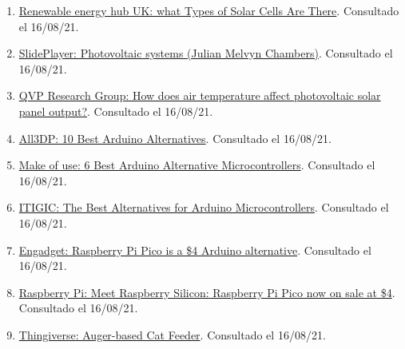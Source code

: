 \documentclass[12pt]{article}
\begin{document}
\begin{enumerate}
			\item 
			\label{bib: renewable energy hub main types photo cells}
			\href{https://www.renewableenergyhub.co.uk/main/solar-panels/types-of-solar-cell/}{Renewable energy hub UK: what Types of Solar Cells Are There}. Consultado el 16/08/21.
			
			\item 
			\label{bib: SlidePlayer Photovoltaic systems}
			\href{https://slideplayer.com/slide/9144319/}{SlidePlayer: Photovoltaic systems (Julian Melvyn Chambers)}. Consultado el 16/08/21.
			
			\item 
			\label{bib: QVP air temp affect solar panel output}
			\href{https://www.qpvgroup.org/blog/2019/2/3/how-does-air-temperature-affect-photovoltaic-solar-panel-output}{QVP Research Group: How does air temperature affect photovoltaic solar panel output?}. Consultado el 16/08/21.
			
			\item 
			\label{bib: arduino alternatives}
			\href{https://all3dp.com/2/best-arduino-alternatives/}{All3DP: 10 Best Arduino Alternatives}. Consultado el 16/08/21.
			
			\item 
			\label{bib: microcontrollers alternative to arduino}
			\href{https://www.makeuseof.com/tag/best-arduino-alternative-microcontrollers/}{Make of use: 6 Best Arduino Alternative Microcontrollers}. Consultado el 16/08/21.
			
			\item 
			\label{bib: alternative to arduino}
			\href{https://itigic.com/best-alternatives-for-arduino-microcontrollers/}{ITIGIC: The Best Alternatives for Arduino Microcontrollers}. Consultado el 16/08/21.
			
			\item 
			\label{bib: raspberry pi pico}
			\href{https://www.engadget.com/raspberry-pi-pico-microcontroller-154235348.html?guccounter=1}{Engadget: Raspberry Pi Pico is a \$4 Arduino alternative}. Consultado el 16/08/21.
			
						
			\item 
			\label{bib: raspberry pi pico 2}
			\href{https://www.raspberrypi.org/blog/raspberry-pi-silicon-pico-now-on-sale/}{Raspberry Pi: Meet Raspberry Silicon: Raspberry Pi Pico now on sale at \$4}. Consultado el 16/08/21.
			
						
			\item 
			\label{bib: thingiverse helices comedero}
			\href{https://www.thingiverse.com/thing:27854}{Thingiverse: Auger-based Cat Feeder}. Consultado el 16/08/21.
			

\end{enumerate}
\end{document}
